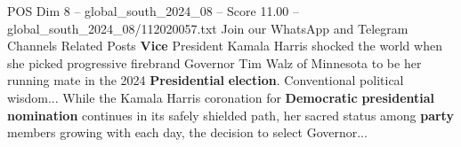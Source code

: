 \begin{textsample}{POS Dim 8 – global\_south\_2024\_08 – Score 11.00 – global\_south\_2024\_08/112020057.txt}
Join our WhatsApp and Telegram Channels Related Posts \textbf{Vice} President Kamala Harris shocked the world when she picked progressive firebrand Governor Tim Walz of Minnesota to be her running mate in the 2024 \textbf{Presidential} \textbf{election}.
Conventional political wisdom...
While the Kamala Harris coronation for \textbf{Democratic} \textbf{presidential} \textbf{nomination} continues in its safely shielded path, her sacred status among \textbf{party} members growing with each day, the decision to select Governor...

\end{textsample}
